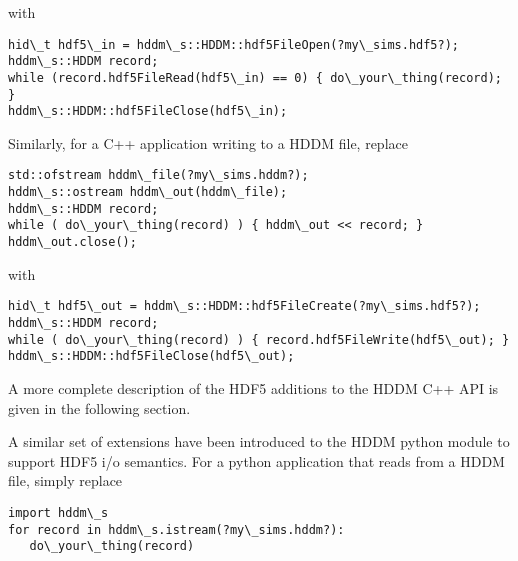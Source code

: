 \documentclass{revtex4}
\begin{document}
with

\vspace{0.5cm}
\begin{minipage}{12cm}
\begin{verbatim}
hid\_t hdf5\_in = hddm\_s::HDDM::hdf5FileOpen(?my\_sims.hdf5?);
hddm\_s::HDDM record;
while (record.hdf5FileRead(hdf5\_in) == 0) { do\_your\_thing(record); }
hddm\_s::HDDM::hdf5FileClose(hdf5\_in);
\end{verbatim}
\end{minipage}
\vspace{0.5cm}

Similarly, for a C++ application writing to a HDDM file, replace

\vspace{0.5cm}
\begin{minipage}{12cm}
\begin{verbatim}
std::ofstream hddm\_file(?my\_sims.hddm?);
hddm\_s::ostream hddm\_out(hddm\_file);
hddm\_s::HDDM record;
while ( do\_your\_thing(record) ) { hddm\_out << record; }
hddm\_out.close();
\end{verbatim}
\end{minipage}
\vspace{0.5cm}

with

\vspace{0.5cm}
\begin{minipage}{12cm}
\begin{verbatim}
hid\_t hdf5\_out = hddm\_s::HDDM::hdf5FileCreate(?my\_sims.hdf5?);
hddm\_s::HDDM record;
while ( do\_your\_thing(record) ) { record.hdf5FileWrite(hdf5\_out); }
hddm\_s::HDDM::hdf5FileClose(hdf5\_out);
\end{verbatim}
\end{minipage}
\vspace{0.5cm}

A more complete description of the HDF5 additions to the HDDM C++ API is
given in the following section.

A similar set of extensions have been introduced to the HDDM python module
to support HDF5 i/o semantics. For a python application that reads from a
HDDM file, simply replace

\vspace{0.5cm}
\begin{minipage}{12cm}
\begin{verbatim}
import hddm\_s
for record in hddm\_s.istream(?my\_sims.hddm?):
   do\_your\_thing(record)
\end{verbatim}
\end{minipage}
\vspace{0.5cm}
\end{document}
